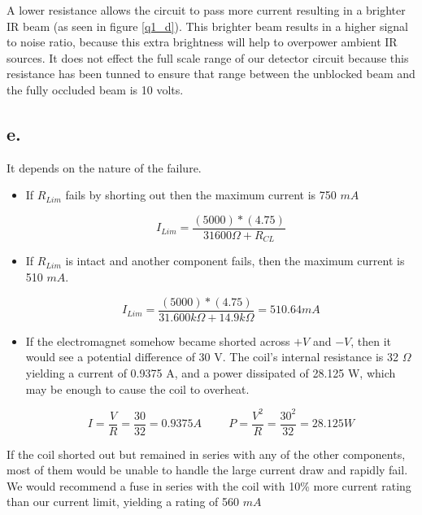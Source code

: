 \documentclass{article}
\theoremstyle{plain}
\theoremstyle{definition}
\theoremstyle{remark}
\begin{document}
A lower resistance allows the circuit to pass more current resulting in a brighter IR beam (as seen in figure \ref{q1_d}). This brighter beam results in a higher signal to noise ratio, because this extra brightness will help to overpower ambient IR sources. It does not effect the full scale range of our detector circuit because this resistance has been tunned to ensure that range between the unblocked beam and the fully occluded beam is 10 volts.  \\  

\subsection*{e.}
It depends on the nature of the failure. 

\begin{itemize}
\item If $R_{Lim}$ fails by shorting out then the maximum current is 750 $mA$ 

$$I_{Lim} = \frac{(5000)*(4.75)}{31600\Omega + R_{CL}} $$

\item If $R_{Lim}$ is intact and another component fails, then the maximum current is 510 $mA$. 

$$I_{Lim} = \frac{(5000)*(4.75)}{31.600k\Omega + 14.9k\Omega} =510.64mA$$

\item If the electromagnet somehow became shorted across $+V$ and $-V$, then it would see a potential difference of 30 V.  The coil's internal resistance is 32 $\Omega$ yielding a current of 0.9375 A, and a power dissipated of 28.125 W, which may be enough to cause the coil to overheat.

$$I = \frac{V}{R} = \frac{30}{32} = 0.9375 A \hspace{1cm}  P = \frac{V^{2}}{R} = \frac{30^2}{32} = 28.125 W $$
\end{itemize}

If the coil shorted out but remained in series with any of the other components, most of them would be unable to handle the large current draw and rapidly fail.  We would recommend a fuse in series with the coil with 10\% more current rating than our current limit, yielding a rating of 560 $mA$
\end{document}
